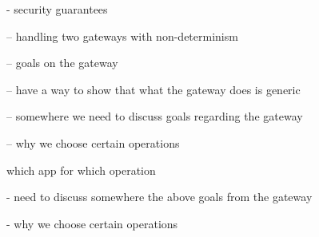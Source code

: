 
- security guarantees


-- handling two gateways with non-determinism




-- goals on the gateway

-- have a way to show that what the gateway does is generic 
   
-- somewhere we need to discuss goals regarding the gateway

-- why we choose certain operations

which app for which operation


- need to discuss somewhere the above goals from the gateway


- why we choose certain operations

